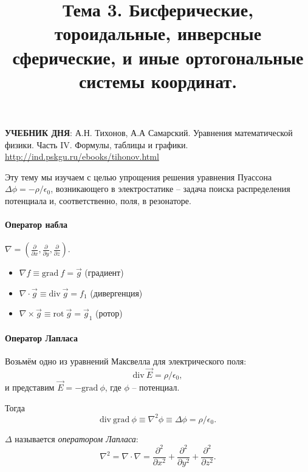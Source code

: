 \documentclass[12pt]{report}
\title{Тема 3. Бисферические, тороидальные, инверсные сферические, и иные ортогональные системы координат.}
\renewcommand{\div}{\mathrm{div~}}
\renewcommand{\grad}{\mathrm{grad~}}
\renewcommand{\rot}{\mathrm{rot~}}
\begin{document}
	\maketitle
	
\begin{tcolorbox}
	\textbf{УЧЕБНИК ДНЯ}:
	А.Н. Тихонов, А.А Самарский. Уравнения математической физики.
	Часть IV. Формулы, таблицы и графики.
	\url{http://ind.pskgu.ru/ebooks/tihonov.html}
\end{tcolorbox}
	
Эту тему мы изучаем с целью упрощения решения уравнения Пуассона $\Delta\phi = -\rho/\epsilon_0$, возникающего в электростатике -- задача поиска распределения потенциала и, соответственно, поля, в резонаторе.

\paragraph{Оператор набла} $\nabla = (\frac{\partial}{\partial x}, \frac{\partial}{\partial y}, \frac{\partial}{\partial z})$.
\begin{itemize}
	\item $\nabla f \equiv \grad f = \vec g$ (градиент)
	\item $\nabla\cdot\vec g \equiv \div\vec g = f_1$ (дивергенция)
	\item $\nabla\times\vec g \equiv \rot\vec g = \vec g_1$ (ротор)
\end{itemize}

\paragraph{Оператор Лапласа}
Возьмём одно из уравнений Максвелла для электрического поля:
\[
\div \vec E = \rho/\epsilon_0,
\]
и представим $\vec E = -\grad \phi$, где $\phi$ -- потенциал.

Тогда
\[
\div\grad\phi \equiv \nabla^2 \phi \equiv \Delta\phi = \rho/\epsilon_0.
\]

$\Delta$ называется \emph{оператором Лапласа}:
\[
\nabla^2 = \nabla\cdot\nabla = \frac{\partial^2}{\partial x^2} + \frac{\partial^2}{\partial y^2} + \frac{\partial^2}{\partial z^2}.
\]
\end{document}
